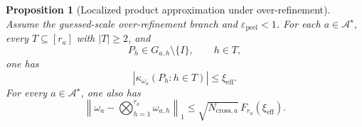 \documentclass[
  aps,
  prx,
  reprint,
  superscriptaddress,
  amsmath,
  amssymb,
  nofootinbib,
  longbibliography
]{revtex4-2}
\newtheorem{proposition}[theorem]{Proposition}
\begin{document}
\begin{proposition}[Localized product approximation under over-refinement]
\label{prop:supp-localized-overrefined-product}
Assume the guessed-scale over-refinement branch and
$\varepsilon_{\mathrm{peel}}<1$.
For each $a\in\mathcal A^\star$, every $T\subseteq[r_a]$ with $|T|\ge2$,
and
\begin{equation}
P_h\in G_{a,h}\setminus\{I\},
\qquad h\in T,
\end{equation}
one has
\begin{equation}
\left|
\kappa_{\omega_a}(P_h:h\in T)
\right|
\le
\xi_{\mathrm{eff}}.
\label{eq:supp-localized-split-cumulants}
\end{equation}
For every $a\in\mathcal A^\star$, one also has
\begin{equation}
\left\|\omega_a-\bigotimes_{h=1}^{r_a}\omega_{a,h}\right\|_1
\le
\sqrt{N_{\mathrm{cross},a}}\,F_{r_a}(\xi_{\mathrm{eff}}).
\label{eq:supp-split-product-error-bound}
\end{equation}
\end{proposition}
\end{document}
